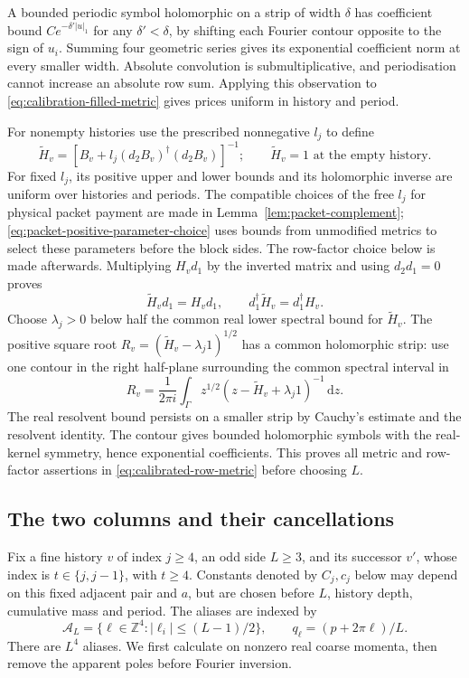 \documentclass[11pt,reqno]{amsart}
\numberwithin{equation}{section}
\theoremstyle{definition}
\theoremstyle{remark}
\newcommand{\Z}{\mathbb Z}
\newcommand{\dd}{\mathrm d}
\begin{document}
A bounded periodic symbol holomorphic on a strip of width
\(\delta\) has coefficient bound \(Ce^{-\delta'|u|_1}\) for
any \(\delta'<\delta\), by shifting each Fourier contour
opposite to the sign of \(u_i\). Summing four geometric series
gives its exponential coefficient norm at every smaller width.
Absolute convolution is submultiplicative, and periodisation
cannot increase an absolute row sum. Applying this observation
to \eqref{eq:calibration-filled-metric} gives prices uniform in
history and period.

For nonempty histories use the prescribed nonnegative \(l_j\)
to define
\begin{equation}
 \widetilde H_v=
  [B_v+l_j(d_2B_v)^\dagger(d_2B_v)]^{-1};
 \qquad \widetilde H_v=1\text{ at the empty history}.
 \label{eq:calibration-positive-extension}
\end{equation}
For fixed \(l_j\), its positive upper and lower bounds and
its holomorphic inverse are uniform over histories and periods.
The compatible choices of the free \(l_j\) for physical packet
payment are made in Lemma~\ref{lem:packet-complement};
\eqref{eq:packet-positive-parameter-choice} uses bounds from
unmodified metrics to select these parameters before the block
sides. The row-factor choice below is made afterwards.
Multiplying \(H_vd_1\) by the inverted matrix
and using \(d_2d_1=0\) proves
\[
 \widetilde H_vd_1=H_vd_1,\qquad
                         d_1^\dagger\widetilde H_v=d_1^\dagger H_v.
\]
Choose \(\lambda_j>0\) below half the common real lower
spectral bound for \(\widetilde H_v\).
The positive square root \(R_v=(\widetilde H_v-\lambda_j1)^{1/2}\)
has a common holomorphic strip: use one contour in the right
half-plane surrounding the common spectral interval in
\[
 R_v=\frac1{2\pi i}\int_\Gamma
       z^{1/2}(z-\widetilde H_v+\lambda_j1)^{-1}\,\dd z.
\]
The real resolvent bound persists on a smaller strip by Cauchy's
estimate and the resolvent identity. The contour gives bounded
holomorphic symbols with the real-kernel symmetry, hence
exponential coefficients. This proves all metric and row-factor
assertions in \eqref{eq:calibrated-row-metric} before choosing \(L\).

\subsection{The two columns and their cancellations}
\label{sec:calibration-column-symbols}

Fix a fine history \(v\) of index \(j\ge4\), an odd side
\(L\ge3\), and its successor \(v'\), whose index is
\(t\in\{j,j-1\}\), with \(t\ge4\). Constants denoted by
\(C_j,c_j\) below may depend on this fixed adjacent pair
and \(a\), but are chosen before \(L\), history depth,
cumulative mass and period. The aliases are indexed by
\[
 \mathcal A_L=\{\ell\in\Z^4:|\ell_i|\le(L-1)/2\},
                    \qquad q_\ell=(p+2\pi\ell)/L.
\]
There are \(L^4\) aliases. We first calculate on nonzero
real coarse momenta, then remove the apparent poles before
Fourier inversion.
\end{document}
